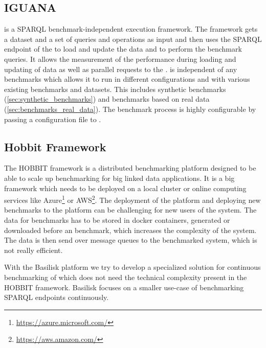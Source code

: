 \subsection{IGUANA}
\label{sec:iguana}
\iguana{} is a SPARQL benchmark-independent execution framework\cite{conradsIguanaGenericFramework2017}.
The framework gets a dataset and a set of queries and operations as input and then uses the SPARQL endpoint of the \ts{} to load and update the data and to perform the benchmark queries.
It allows the measurement of the performance during loading and updating of data as well as parallel requests to the \ts{}.
\iguana{} is independent of any benchmarks which allows it to run in different configurations and with various existing benchmarks and datasets.
This includes synthetic benchmarks (\ref{sec:synthetic_benchmarks}) and benchmarks based on real data (\ref{sec:benchmarks_real_data}).
The benchmark process is highly configurable by passing a configuration file to \iguana{}.


\subsection{Hobbit Framework}
The HOBBIT framework is a distributed benchmarking platform designed to be able to scale up benchmarking for big linked data applications\cite{roderHOBBITPlatformBenchmarking}.
It is a big framework which needs to be deployed on a local cluster or online computing services like Azure\footnote{\url{https://azure.microsoft.com/}} or AWS\footnote{\url{https://aws.amazon.com/}}.
The deployment of the platform and deploying new benchmarks to the platform can be challenging for new users of the system\cite{roderHOBBITPlatformBenchmarking}.
The data for benchmarks has to be stored in docker containers, generated or downloaded before an benchmark, which increases the complexity of the system.
The data is then send over message queues to the benchmarked system, which is not really efficient.

With the Basilisk platform we try to develop a specialized solution for continuous benchmarking of \tsp{} which does not need the technical complexity present in the HOBBIT framework.
Basilisk focuses on a smaller use-case of benchmarking SPARQL endpoints continuously.

